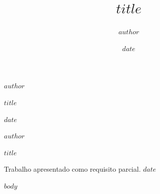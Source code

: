 \documentclass[
  12pt,
  oneside,
  openright
]{abntex2}
\title{$title$}
\author{$author$}
\date{$date$}
\begin{document}
\textual

\begin{capa}
  \centering
  {\ABNTEXchapterfont\large $author$ \par}
  \vfill
  {\ABNTEXchapterfont\bfseries\Large $title$ \par}
  \vfill
  {\large $date$}
\end{capa}

\begin{folhaderosto}
  \centering
  {\ABNTEXchapterfont $author$ \par}
  \vfill
  {\ABNTEXchapterfont\bfseries\Large $title$ \par}
  \vfill
  Trabalho apresentado como requisito parcial.  
  \vfill
  {\large $date$}
\end{folhaderosto}

\tableofcontents*
\cleardoublepage

$body$
\end{document}
